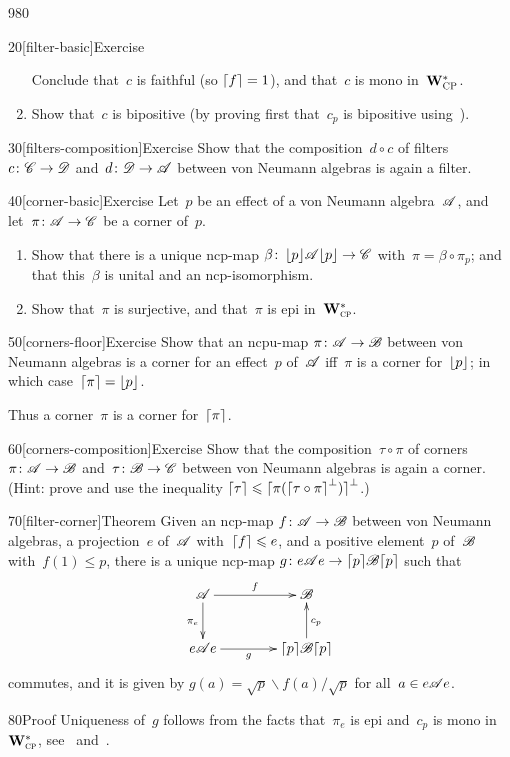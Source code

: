 \begin{parsec}{980}
\begin{point}{20}[filter-basic]{Exercise}
\begin{enumerate}
Conclude that~$c$
is faithful (so $\left\lceil f\right\rceil=1$), and that~$c$ is mono in~$\mathbf{W}^*_{\text{\textsc{CP}}}$.
\item
Show that~$c$ is bipositive
(by proving first that~$c_p$
is bipositive using~).
\end{enumerate}
\spacingfix%
\end{point}%
\begin{point}{30}[filters-composition]{Exercise}%
Show that the composition~$d\circ c$
of filters~$c\colon\mathscr{C}\to\mathscr{D}$
and~$d\colon \mathscr{D}\to\mathscr{A}$ 
between von Neumann algebras
is again a filter.
\end{point}
\begin{point}{40}[corner-basic]{Exercise}%
Let~$p$ be an effect of a von Neumann algebra~$\mathscr{A}$,
and let~$\pi\colon \mathscr{A}\to\mathscr{C}$ be a corner of~$p$.
\begin{enumerate}
\item
Show that there is a unique ncp-map
$\beta \colon \left\lfloor p\right\rfloor\!\mathscr{A}\!\left\lfloor p\right\rfloor\to\mathscr{C}$
with~$\pi = \beta\circ \pi_p$;
and that this~$\beta$ is unital and an ncp-isomorphism.
\item
Show that~$\pi$ is surjective, and that~$\pi$ is epi in~$\mathbf{W}^*_{\text{\textsc{cp}}}$.
\end{enumerate}
\spacingfix%
\end{point}%
\begin{point}{50}[corners-floor]{Exercise}%
Show that an ncpu-map $\pi\colon \mathscr{A}\to\mathscr{B}$
between von Neumann algebras
is a corner for an effect~$p$ of~$\mathscr{A}$
iff~$\pi$ is a corner for~$\left\lfloor p\right\rfloor$;
in which case~$\left\lceil\pi\right\rceil=\left\lfloor p\right\rfloor$.

Thus a corner~$\pi$ is a corner for~$\left\lceil\pi\right\rceil$.
\end{point}
\begin{point}{60}[corners-composition]{Exercise}%
Show that the composition~$\tau\circ \pi$
of corners~$\pi\colon \mathscr{A}\to\mathscr{B}$
and~$\tau\colon \mathscr{B}\to\mathscr{C}$
between von Neumann algebras
is again a corner.\\
(Hint:
prove
and use the inequality
$\left\lceil\tau\right\rceil\leqslant \left\lceil\smash{\pi(\left\lceil\tau\circ \pi\right\rceil^\perp)}\right\rceil^\perp$.)
\end{point}
\begin{point}{70}[filter-corner]{Theorem}%
Given an ncp-map $f\colon\mathscr{A}\to\mathscr{B}$
between von Neumann algebras,
a projection~$e$ of~$\mathscr{A}$
with~$\left\lceil f\right\rceil\leqslant e$,
and a positive element~$p$
of~$\mathscr{B}$ with~$f(1) \leq p$,
there is a unique ncp-map
$g \colon e\mathscr{A} e
\to \left\lceil p\right\rceil\!\mathscr{B}\!\left\lceil p\right\rceil$
such that
\begin{equation*}
\xymatrix@C=4em{
\scrA
\ar[r]^-f
\ar[d]_{\pi_e}
&
\scrB
\\
e\scrA e
\ar[r]_-g
& 
\ceil{p}\!\scrB\!\ceil{p}
\ar[u]_{c_p}
}
\end{equation*}
commutes,
and it is given by
$g(a)=\sqrt{p}\backslash f(a)/\!\sqrt{p}$
for all~$a\in e\mathscr{A} e$.
\begin{point}{80}{Proof}%
Uniqueness of~$g$ follows from the facts
that~$\pi_e$ is epi and~$c_p$ is mono
in~$\mathbf{W}^*_{\text{\textsc{cp}}}$,
see~ and~.


\end{point}
\end{point}
\end{parsec}
